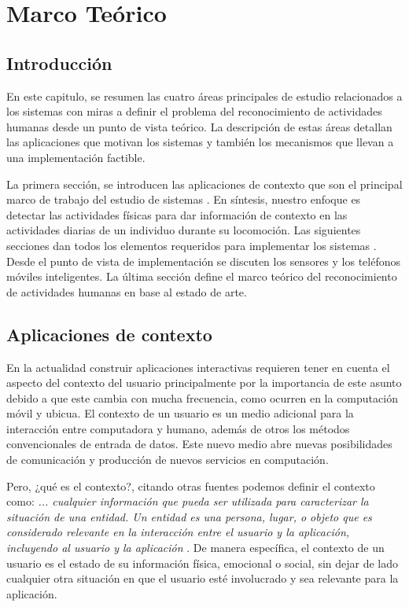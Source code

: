 
\chapter{Marco Teórico}

\label{chap2:marco-teorico}

\section{Introducción}

\label{sec21:introduccion}En este capitulo, se resumen las cuatro
áreas principales de estudio relacionados a los sistemas 
con miras a definir el problema del reconocimiento de actividades
humanas desde un punto de vista teórico. La descripción de estas áreas
detallan las aplicaciones que motivan los sistemas  y también
los mecanismos que llevan a una implementación factible. 

La primera sección, se introducen las aplicaciones de contexto que
son el principal marco de trabajo del estudio de sistemas .
En síntesis, nuestro enfoque es detectar las actividades físicas para
dar información de contexto en las actividades diarias de un individuo
durante su locomoción. Las siguientes secciones dan todos los elementos
requeridos para implementar los sistemas . Desde el punto
de vista de implementación se discuten los sensores y los teléfonos
móviles inteligentes. La última sección define el marco teórico del
reconocimiento de actividades humanas en base al estado de arte.

\section{Aplicaciones de contexto}

\label{sec22:contexto}En la actualidad construir aplicaciones interactivas
requieren tener en cuenta el aspecto del contexto del usuario principalmente
por la importancia de este asunto debido a que este cambia con mucha
frecuencia, como ocurren en la computación móvil y ubicua. El contexto
de un usuario es un medio adicional para la interacción entre computadora
y humano, además de otros los métodos convencionales de entrada de
datos. Este nuevo medio abre nuevas posibilidades de comunicación
y producción de nuevos servicios en computación. 

Pero, ¿qué es el contexto?, citando otras fuentes podemos definir
el contexto como: \textquotedbl{}\emph{... cualquier información que
pueda ser utilizada para caracterizar la situación de una entidad.
Un entidad es una persona, lugar, o objeto que es considerado relevante
en la interacción entre el usuario y la aplicación, incluyendo al
usuario y la aplicación}\textquotedbl{} \cite{Dey2000}. De manera
específica, el contexto de un usuario es el estado de su información
física, emocional o social, sin dejar de lado cualquier otra situación
en que el usuario esté involucrado y sea relevante para la aplicación.

